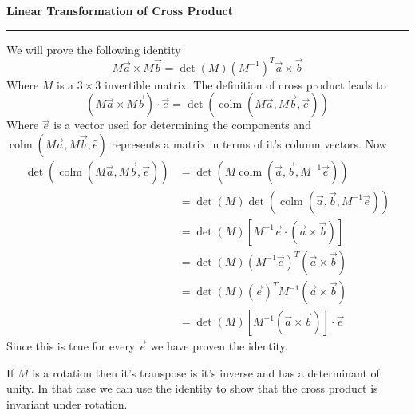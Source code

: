 \documentclass[a4paper, 11pt]{article}
\DeclareMathOperator{\colm}{colm}
\begin{document}
\begin{center}
	\Large\bfseries Linear Transformation of Cross Product
	\vspace{.15em}\hrule
\end{center}

We will prove the following identity
\begin{equation}
	M \vec a \times M \vec b = \det (M) (M^{-1})^T \vec a \times \vec b
\end{equation}
Where $M$ is a $3 \times 3$ invertible matrix. The definition of cross product leads to
\begin{equation}
	(M \vec a \times M \vec b) \cdot \vec e = \det ( \colm(M \vec a, M \vec b, \vec e ))
\end{equation}
Where $\vec e$ is a vector used for determining the components and $\colm(M \vec a, M \vec b, \hat
e)$ represents a matrix in terms of it's column vectors. Now
\begin{align*}
	\det (\colm(M \vec a, M \vec b, \vec e)) &= \det ( M \colm(\vec a, \vec b, M^{-1} \vec e ) ) \\
	&= \det (M) \det(\colm(\vec a, \vec b, M^{-1} \vec e)) \\
	&= \det (M) [ M^{-1} \vec e \cdot (\vec a \times \vec b) ] \\
	&= \det (M) (M^{-1} \vec e)^T (\vec a \times \vec b) \\
	&= \det(M) (\vec e)^T M^{-1} (\vec a \times \vec b) \\
	&= \det(M) [M^{-1} (\vec a \times \vec b)] \cdot \vec e
\end{align*}
Since this is true for every $\vec e$ we have proven the identity.

If $M$ is a rotation then it's transpose is it's inverse and has a determinant of unity. In that case
we can use the identity to show that the cross product is invariant under rotation.
\end{document}
